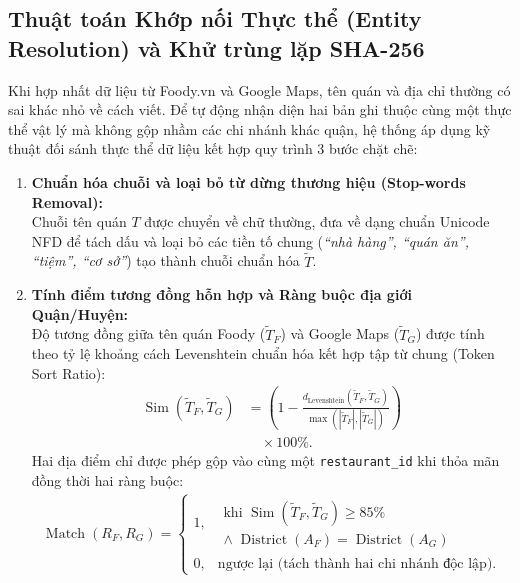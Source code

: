 \documentclass[12pt, a4paper]{article}
\begin{document}
\subsection{Thuật toán Khớp nối Thực thể (Entity Resolution) và Khử trùng lặp SHA-256}
Khi hợp nhất dữ liệu từ Foody.vn và Google Maps, tên quán và địa chỉ thường có sai khác nhỏ về cách viết. Để tự động nhận diện hai bản ghi thuộc cùng một thực thể vật lý mà không gộp nhầm các chi nhánh khác quận, hệ thống áp dụng kỹ thuật đối sánh thực thể dữ liệu \cite{christen2012data} kết hợp quy trình 3 bước chặt chẽ:

\begin{enumerate}[leftmargin=1.0cm, label=\textbf{Bước \arabic*:}, itemsep=5pt]
    \item \textbf{Chuẩn hóa chuỗi và loại bỏ từ dừng thương hiệu (Stop-words Removal):}\\
    Chuỗi tên quán $T$ được chuyển về chữ thường, đưa về dạng chuẩn Unicode NFD để tách dấu và loại bỏ các tiền tố chung (\textit{``nhà hàng'', ``quán ăn'', ``tiệm'', ``cơ sở''}) tạo thành chuỗi chuẩn hóa $\tilde{T}$.

    \item \textbf{Tính điểm tương đồng hỗn hợp và Ràng buộc địa giới Quận/Huyện:}\\
    Độ tương đồng giữa tên quán Foody ($\tilde{T}_F$) và Google Maps ($\tilde{T}_G$) được tính theo tỷ lệ khoảng cách Levenshtein chuẩn hóa kết hợp tập từ chung (Token Sort Ratio):
    \begin{equation}
    \begin{aligned}
        \operatorname{Sim}(\tilde{T}_F,\tilde{T}_G)
        &= \left(1-\frac{d_{\text{Levenshtein}}(\tilde{T}_F,\tilde{T}_G)}
        {\max\left(|\tilde{T}_F|,|\tilde{T}_G|\right)}\right)\\
        &\quad\times 100\%.
    \end{aligned}
    \end{equation}
    Hai địa điểm chỉ được phép gộp vào cùng một \texttt{restaurant\_id} khi thỏa mãn đồng thời hai ràng buộc:
    \begin{equation}
    \begin{aligned}
        \operatorname{Match}(R_F,R_G)
        =\begin{cases}
        1, & \begin{gathered}\text{khi }\operatorname{Sim}(\tilde{T}_F,\tilde{T}_G)\ge 85\%\\
        \land\;\operatorname{District}(A_F)=\operatorname{District}(A_G)
        \end{gathered}\\[4pt]
        0, & \text{ngược lại (tách thành hai chi nhánh độc lập).}
        \end{cases}
    \end{aligned}
    \end{equation}


\end{enumerate}
\end{document}
